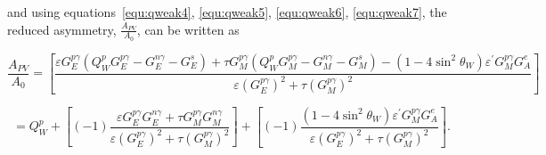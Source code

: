 \noindent
and using equations~\ref{equ:qweak4}, \ref{equ:qweak5}, \ref{equ:qweak6}, \ref{equ:qweak7}, the reduced asymmetry, $\displaystyle\frac{A_{PV}}{A_{0}}$, can be written as 

\begin{equation} \label{equ:qweak9}
\frac{A_{PV}}{A_{0}} = \left[ \frac{{\varepsilon} {G_{E}^{p\gamma}} (Q_{W}^{p} {G_{E}^{p\gamma}} - {G_{E}^{n\gamma}} - {G_{E}^{s}} ) + {\tau} {G_{M}^{p\gamma}} (Q_{W}^{p} {G_{M}^{p\gamma}} - {G_{M}^{n\gamma}} - {G_{M}^{s}} ) - (1-4\sin^{2}\theta_{W}){\varepsilon^{\prime}}{G_{M}^{p\gamma}}{G_{A}^{e}} } { {\varepsilon}({G_{E}^{p\gamma}})^{2} + {\tau}({G_{M}^{p\gamma}})^{2} } \right]
\end{equation}

%

\begin{equation} \label{equ:qweak10}
 = Q_{W}^{p} + \left[(-1)\frac{{\varepsilon}{G_{E}^{p\gamma}}{G_{E}^{n\gamma}} + {\tau}{G_{M}^{p\gamma}}{G_{M}^{n\gamma}} }{ {\varepsilon}({G_{E}^{p\gamma}})^{2} + {\tau}({G_{M}^{p\gamma}})^{2} } \right]  + \left[(-1)\frac{(1-4\sin^{2}\theta_{W}){\varepsilon^{\prime}}{G_{M}^{p\gamma}}{G_{A}^{e}} }{ {\varepsilon}({G_{E}^{p\gamma}})^{2} + {\tau}({G_{M}^{p\gamma}})^{2} } \right].
\end{equation}




